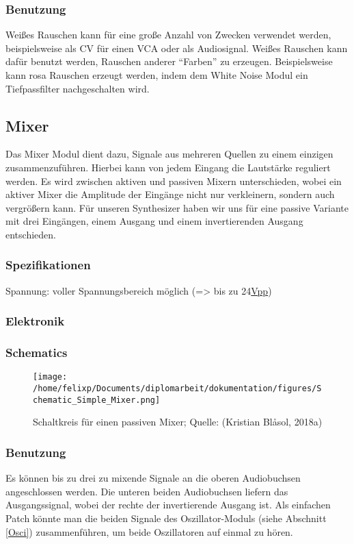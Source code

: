 \subsubsection{Benutzung}
\label{sec:orga97a1b0}
Weißes Rauschen kann für eine große Anzahl von Zwecken verwendet werden, beispielsweise als \acl{CV} für einen \ac{VCA} oder als Audiosignal. Weißes Rauschen kann dafür benutzt werden, Rauschen anderer "`Farben"' zu erzeugen. Beispielsweise kann rosa Rauschen erzeugt werden, indem dem White Noise Modul ein Tiefpassfilter nachgeschalten wird.
\subsection{Mixer \label{Mixer}}
\label{sec:orgb2ecddd}
Das Mixer Modul dient dazu, Signale aus mehreren Quellen zu einem einzigen zusammenzuführen. Hierbei kann von jedem Eingang die Lautstärke reguliert werden. Es wird zwischen aktiven und passiven Mixern unterschieden, wobei ein aktiver Mixer die Amplitude der Eingänge nicht nur verkleinern, sondern auch vergrößern kann. Für unseren Synthesizer haben wir uns für eine passive Variante mit drei Eingängen, einem Ausgang und einem invertierenden Ausgang entschieden.

\subsubsection{Spezifikationen}
\label{sec:orga95524b}
Spannung: voller Spannungsbereich möglich (=> bis zu 24\href{file:///home/felixp/Documents/diplomarbeit/dokumentation/content/hauptteil.org}{Vpp})
\subsubsection{Elektronik}
\label{sec:org6d02393}
\subsubsection{Schematics}
\label{sec:org0046b0a}
\begin{figure}[htbp]
\centering
\texttt{[image: /home/felixp/Documents/diplomarbeit/dokumentation/figures/Schematic\_Simple\_Mixer.png]}
\caption{Schaltkreis für einen passiven Mixer; Quelle: (Kristian Blåsol, 2018a)}
\end{figure}
\subsubsection{Benutzung}
\label{sec:org50c4dfb}
Es können bis zu drei zu mixende Signale an die oberen Audiobuchsen angeschlossen werden. Die unteren beiden Audiobuchsen liefern das Ausgangssignal, wobei der rechte der invertierende Ausgang ist. Als einfachen Patch könnte man die beiden Signale des Oszillator-Moduls (siehe Abschnitt \ref{Osci}) zusammenführen, um beide Oszillatoren auf einmal zu hören.
